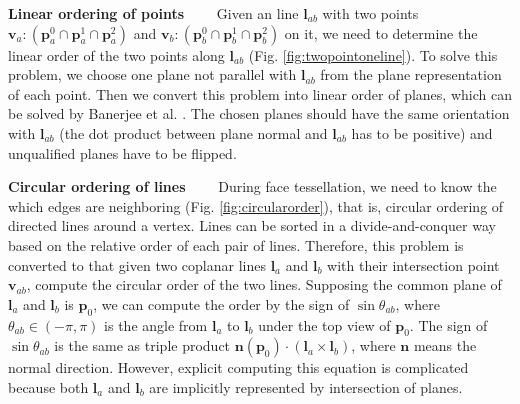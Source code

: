 \documentclass[10pt,journal,compsoc]{IEEEtran}
\begin{document}
\vspace{0.5em}
\noindent \textbf{Linear ordering of points}~~~~
Given an line $\bm{l}_{ab}$ with two points $\bm{v}_a\colon(\bm{p}_a^0\cap\bm{p}_a^1\cap\bm{p}_a^2)$ and $\bm{v}_b\colon(\bm{p}_b^0\cap\bm{p}_b^1\cap\bm{p}_b^2)$ on it, we need to determine the linear order of the two points along $\bm{l}_{ab}$ (Fig. \ref{fig:twopointoneline}). To solve this problem, we choose one plane not parallel with $\bm{l}_{ab}$ from the plane representation of each point. Then we convert this problem into linear order of planes, which can be solved by Banerjee et al. \cite{banerjee1996topologically}. The chosen planes should have the same orientation with $\bm{l}_{ab}$ (the dot product between plane normal and $\bm{l}_{ab}$ has to be positive) and unqualified planes have to be flipped.


\vspace{0.5em}
\noindent \textbf{Circular ordering of lines}~~~~
During face tessellation, we need to know the which edges are neighboring (Fig. \ref{fig:circularorder}), that is, circular ordering of directed lines around a vertex. Lines can be sorted in a divide-and-conquer way based on the relative order of each pair of lines. Therefore, this problem is converted to that given two coplanar lines $\bm{l}_a$ and $\bm{l}_b$ with their intersection point $\bm{v}_{ab}$, compute the circular order of the two lines. Supposing the common plane of $\bm{l}_a$ and $\bm{l}_b$ is $\bm{p}_0$, we can compute the order by the sign of $\sin{\theta_{ab}}$, where $\theta_{ab}\in(-\pi,\pi)$ is the angle from $\bm{l}_a$ to $\bm{l}_b$ under the top view of $\bm{p}_0$. The sign of $\sin{\theta_{ab}}$ is the same as triple product $\bm{n}(\bm{p}_0) \cdot (\bm{l}_a\times\bm{l}_b)$,
where $\bm{n}$ means the normal direction. However, explicit computing this equation is complicated because both $\bm{l}_a$ and $\bm{l}_b$ are implicitly represented by intersection of planes.
\end{document}
